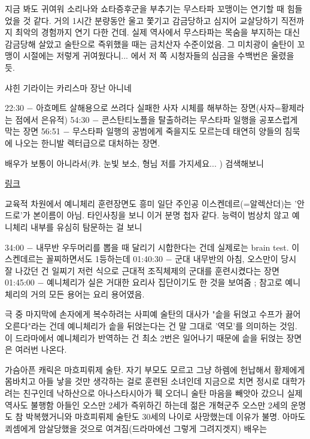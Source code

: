지금 봐도 귀여워 소리나와 쇼타증후군을 부추기는 무스타파 꼬맹이는 연기할 때 힘들었을 것 같다.
거의 1시간 분량동안 울고 쫓기고 감금당하고 심지어 교살당하기 직전까지 최악의 경험까지 연기 다한 건데.
실제 역사에서 무스타파는 목숨을 부지하는 대신 감금당해 살았고 술탄으로 즉위했을 때는 금치산자 수준이었음.
그 미치광이 술탄이 꼬맹이 시절에는 저렇게 귀여웠다니... 에서 저 쪽 시청자들의 심금을 수백번은 울렸을 듯.
\vspace{5mm}

샤힌 기라이는 카리스마 장난 아니네
\vspace{5mm}

22:30 $-$ 아흐메트 살해용으로 쓰려다 실패한 사자 시체를 해부하는 장면(사자=황제라는 점에서 은유적)
54:30 $-$ 콘스탄티노플을 탈출하려는 무스타파 일행을 공포스럽게 막는 장면
56:51 $-$ 무스타파 일행의 공범에게 죽을지도 모르는데 태연히 양들의 침묵에 나오는 한니발 렉터급으로 대처하는 장면.
\vspace{5mm}

배우가 보통이 아니라서(캬. 눈빛 보소, 형님 저를 가지세요... ) 검색해보니
\vspace{5mm}

\href{https://www.google.co.kr/search?q=Erkan+Kol%C3%A7ak+K%C3%B6stendil&biw=1366&bih=614&source=lnms&tbm=isch&sa=X&ved=0ahUKEwiMwJ6MvajJAhVFE6YKHYKJChcQ$\_$AUIBigB}{링크}
\vspace{5mm}

교육적 차원에서 예니체리 훈련장면도 흥미
일단 주인공 이스켄데르(=알렉산더)는 '안드로'가 본이름이 아님.
타인사칭을 보니 이거 분명 첩자 같다. 능력이 범상치 않고 예니체리 내부를 유심히 탐문하는 걸 보니
\vspace{5mm}

34:00 $-$ 내무반 우두머리를 뽑을 때 달리기 시합한다는 건데 실제로는 brain test. 이스켄데르는 꼴찌하면서도 1등하는데
01:40:30 $-$ 군대 내무반의 아침, 오스만이 당시 잘 나갔던 건 일찌기 저런 식으로 근대적 조직체제의 군대를 훈련시켰다는 장면
01:45:00 $-$ 예니체리가 실은 거대한 요리사 집단이기도 한 것을 보여줌 ; 참고로 예니체리의 거의 모든 용어는 요리 용어였음.
\vspace{5mm}

극 중 마지막에 손자에게 복수하려는 사피예 술탄의 대사가 "솥을 뒤얹고 수프가 끓어오른다"라는 건데
예니체리가 솥을 뒤얹는다는 건 말 그대로 '역모'를 의미하는 것임.
이 드라마에서 예니체리가 반역하는 건 최소 2번은 일어나기 때문에 솥을 뒤얹는 장면은 여러번 나온다.
\vspace{5mm}

가슴아픈 캐릭은 마흐피뤼제 술탄.
자기 부모도 모르고 그냥 하렘에 헌납해서 황제에게 몸바치고 아들 낳을 것만 생각하는 걸로 훈련된 소녀인데
지금으로 치면 정시로 대학가려는 친구인데 낙하산으로 아나스타시아가 훽 오더니 술탄 마음을 빼앗아 갔으니
실제 역사도 불행함
아들인 오스만 2세가 즉위하긴 하는데 젊은 개혁군주 오스만 2세의 운명도 참 박복했거니와
마흐피뤼제 술탄도 30세의 나이로 사망했는데 이유가 불명. 아마도 쾨셈에게 암살당했을 것으로 여겨짐(드라마에선 그렇게 그려지겟지)
배우는
\vspace{5mm}

